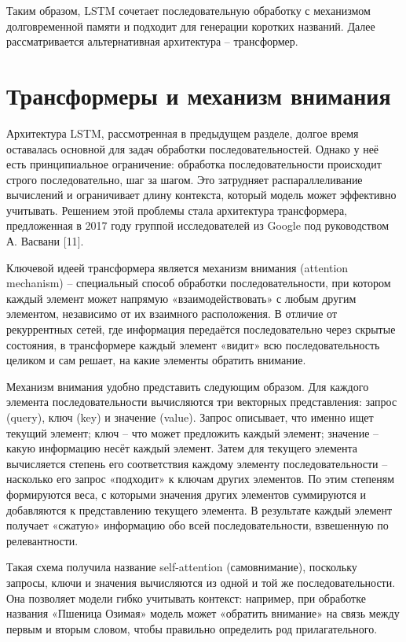 Таким образом, LSTM сочетает последовательную обработку с механизмом долговременной памяти и подходит для генерации коротких названий. Далее рассматривается альтернативная архитектура -- трансформер.

\section{Трансформеры и механизм внимания}\label{ux442ux440ux430ux43dux441ux444ux43eux440ux43cux435ux440ux44b-ux438-ux43cux435ux445ux430ux43dux438ux437ux43c-ux432ux43dux438ux43cux430ux43dux438ux44f}

Архитектура LSTM, рассмотренная в предыдущем разделе, долгое время оставалась основной для задач обработки последовательностей. Однако у неё есть принципиальное ограничение: обработка последовательности происходит строго последовательно, шаг за шагом. Это затрудняет распараллеливание вычислений и ограничивает длину контекста, который модель может эффективно учитывать. Решением этой проблемы стала архитектура трансформера, предложенная в 2017 году группой исследователей из Google под руководством А. Васвани {[}11{]}.

Ключевой идеей трансформера является механизм внимания (attention mechanism) -- специальный способ обработки последовательности, при котором каждый элемент может напрямую «взаимодействовать» с любым другим элементом, независимо от их взаимного расположения. В отличие от рекуррентных сетей, где информация передаётся последовательно через скрытые состояния, в трансформере каждый элемент «видит» всю последовательность целиком и сам решает, на какие элементы обратить внимание.

Механизм внимания удобно представить следующим образом. Для каждого элемента последовательности вычисляются три векторных представления: запрос (query), ключ (key) и значение (value). Запрос описывает, что именно ищет текущий элемент; ключ -- что может предложить каждый элемент; значение -- какую информацию несёт каждый элемент. Затем для текущего элемента вычисляется степень его соответствия каждому элементу последовательности -- насколько его запрос «подходит» к ключам других элементов. По этим степеням формируются веса, с которыми значения других элементов суммируются и добавляются к представлению текущего элемента. В результате каждый элемент получает «сжатую» информацию обо всей последовательности, взвешенную по релевантности.

Такая схема получила название self-attention (самовнимание), поскольку запросы, ключи и значения вычисляются из одной и той же последовательности. Она позволяет модели гибко учитывать контекст: например, при обработке названия «Пшеница Озимая» модель может «обратить внимание» на связь между первым и вторым словом, чтобы правильно определить род прилагательного.

